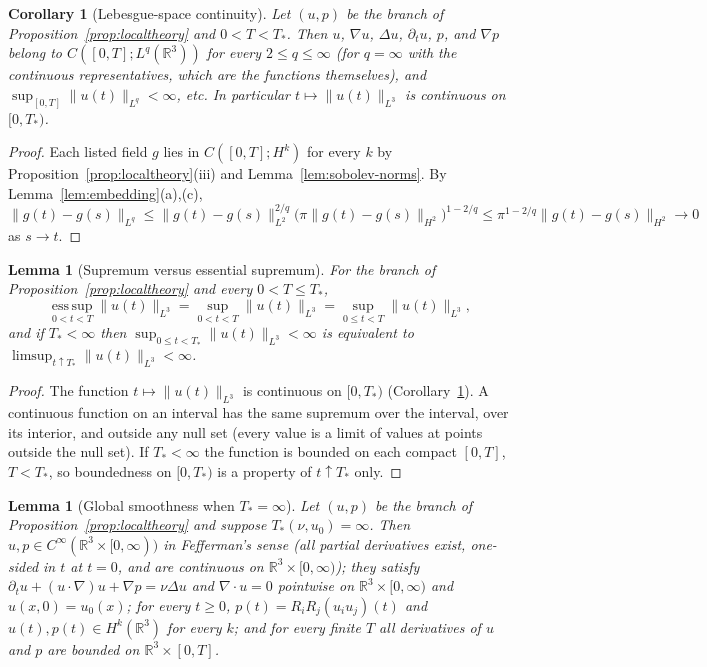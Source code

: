 \documentclass[11pt]{article}
\newtheorem{lemma}[theorem]{Lemma}
\newtheorem{corollary}[theorem]{Corollary}
\theoremstyle{definition}
\theoremstyle{plain}
\newcommand{\R}{\mathbb R}
\newcommand{\norm}[1]{\lVert #1\rVert}
\begin{document}
\begin{corollary}[Lebesgue-space continuity]\label{cor:Lq}
Let $(u,p)$ be the branch of Proposition~\ref{prop:localtheory} and
$0<T<T_*$.  Then $u$, $\nabla u$, $\Delta u$, $\partial_tu$, $p$, and
$\nabla p$ belong to $C([0,T];L^q(\R^3))$ for every $2\leq q\leq\infty$
(for $q=\infty$ with the continuous representatives, which are the
functions themselves), and $\sup_{[0,T]}\norm{u(t)}_{L^q}<\infty$, etc.
In particular $t\mapsto\norm{u(t)}_{L^3}$ is continuous on $[0,T_*)$.
\end{corollary}

\begin{proof}
Each listed field $g$ lies in $C([0,T];H^k)$ for every $k$ by
Proposition~\ref{prop:localtheory}(iii) and Lemma~\ref{lem:sobolev-norms}.
By Lemma~\ref{lem:embedding}(a),(c), $\norm{g(t)-g(s)}_{L^q}\leq
\norm{g(t)-g(s)}_{L^2}^{2/q}\bigl(\pi\norm{g(t)-g(s)}_{H^2}\bigr)^{1-2/q}
\leq\pi^{1-2/q}\norm{g(t)-g(s)}_{H^2}\to0$ as $s\to t$.
\end{proof}

\begin{lemma}[Supremum versus essential supremum]\label{lem:sup-esssup}
For the branch of Proposition~\ref{prop:localtheory} and every
$0<T\leq T_*$,
\[
 \operatorname*{ess\,sup}_{0<t<T}\norm{u(t)}_{L^3}
 =\sup_{0<t<T}\norm{u(t)}_{L^3}=\sup_{0\leq t<T}\norm{u(t)}_{L^3},
\]
and if $T_*<\infty$ then
$\sup_{0\leq t<T_*}\norm{u(t)}_{L^3}<\infty$ is equivalent to
$\limsup_{t\uparrow T_*}\norm{u(t)}_{L^3}<\infty$.
\end{lemma}

\begin{proof}
The function $t\mapsto\norm{u(t)}_{L^3}$ is continuous on $[0,T_*)$
(Corollary~\ref{cor:Lq}).  A continuous function on an interval has the
same supremum over the interval, over its interior, and outside any null
set (every value is a limit of values at points outside the null set).
If $T_*<\infty$ the function is bounded on each compact $[0,T]$,
$T<T_*$, so boundedness on $[0,T_*)$ is a property of $t\uparrow T_*$
only.
\end{proof}

\begin{lemma}[Global smoothness when $T_*=\infty$]\label{lem:global-smooth}
Let $(u,p)$ be the branch of Proposition~\ref{prop:localtheory} and
suppose $T_*(\nu,u_0)=\infty$.  Then $u,p\in C^\infty(\R^3\times[0,\infty))$
in Fefferman's sense (all partial derivatives exist, one-sided in $t$ at
$t=0$, and are continuous on $\R^3\times[0,\infty)$); they satisfy
$\partial_tu+(u\cdot\nabla)u+\nabla p=\nu\Delta u$ and $\nabla\cdot u=0$
pointwise on $\R^3\times[0,\infty)$ and $u(x,0)=u_0(x)$; for every
$t\geq0$, $p(t)=R_iR_j(u_iu_j)(t)$ and $u(t),p(t)\in H^k(\R^3)$ for every
$k$; and for every finite $T$ all derivatives of $u$ and $p$ are bounded
on $\R^3\times[0,T]$.
\end{lemma}
\end{document}
